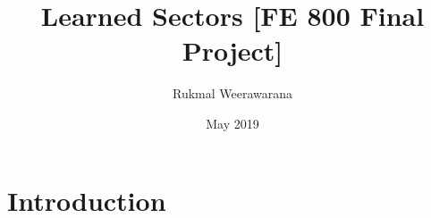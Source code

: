 \documentclass{article}
\title{Learned Sectors [FE 800 Final Project]}
\author{Rukmal Weerawarana}
\date{May 2019}
\begin{document}
\maketitle

\section{Introduction}
\end{document}

